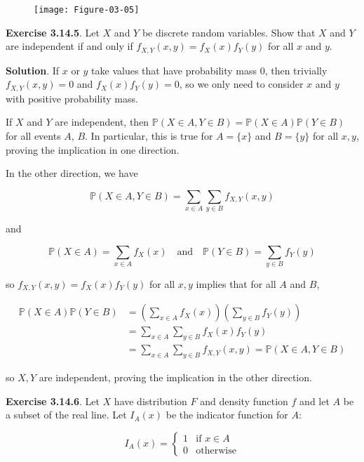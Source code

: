 \begin{figure}[H]
\centering
\texttt{[image: Figure-03-05]}
\end{figure}

\textbf{Exercise 3.14.5}. Let \(X\) and \(Y\) be discrete random
variables. Show that \(X\) and \(Y\) are independent if and only if
\(f_{X, Y}(x, y) = f_X(x) f_Y(y)\) for all \(x\) and \(y\).

\textbf{Solution}. If \(x\) or \(y\) take values that have probability
mass 0, then trivially \(f_{X, Y}(x, y) = 0\) and \(f_X(x) f_Y(y) = 0\),
so we only need to consider \(x\) and \(y\) with positive probability
mass.

If \(X\) and \(Y\) are independent, then
\(\mathbb{P}(X \in A, Y \in B) = \mathbb{P}(X \in A)\mathbb{P}(Y \in B)\)
for all events \(A\), \(B\). In particular, this is true for
\(A = \{x\}\) and \(B = \{ y \}\) for all \(x, y\), proving the
implication in one direction.

In the other direction, we have

\[ \mathbb{P}(X \in A, Y \in B) = \sum_{x \in A} \sum_{y \in B} f_{X, Y}(x, y) \]

and

\[ 
\mathbb{P}(X \in A) = \sum_{x \in A} f_X(x)
\quad \text{and} \quad
\mathbb{P}(Y \in B) = \sum_{y \in B} f_Y(y)
\]

so \(f_{X, Y}(x, y) = f_X(x) f_Y(y)\) for all \(x, y\) implies that for
all \(A\) and \(B\),

\begin{align*}
\mathbb{P}(X \in A) \mathbb{P}(Y \in B) 
& = \left( \sum_{x \in A} f_X(x) \right) \left( \sum_{y \in B} f_Y(y) \right)
\\
& = \sum_{x \in A} \sum_{y \in B} f_X(x) f_Y(y) 
\\
& = \sum_{x \in A} \sum_{y \in B} f_{X, Y}(x, y) = \mathbb{P}(X \in A, Y \in B)
\end{align*}

so \(X, Y\) are independent, proving the implication in the other
direction.

\textbf{Exercise 3.14.6}. Let \(X\) have distribution \(F\) and density
function \(f\) and let \(A\) be a subset of the real line. Let
\(I_A(x)\) be the indicator function for \(A\):

\[
I_A(x) = \begin{cases}
1 &\text{if } x \in A \\
0 &\text{otherwise}
\end{cases}
\]

